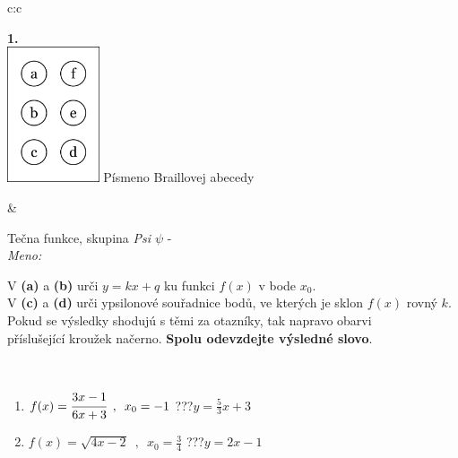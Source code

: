 \documentclass[10pt]{report}
\begin{document}
\begin{tabular}{c:c}
\begin{minipage}[c][104.5mm][t]{0.5\linewidth}
\begin{center}
\begin{minipage}{0.20\linewidth}
\begin{center}
{\Huge\bfseries 1.} \\[2mm]
\includegraphics[height=40mm]{../images/braille.png}
{\small Písmeno Braillovej abecedy}
\end{center}
\end{minipage}
\end{center}
\end{minipage}
&
\begin{minipage}[c][104.5mm][t]{0.5\linewidth}
\begin{center}
\vspace{7mm}
{\huge Tečna funkce, skupina \textit{Psi $\psi$} -}\\[5mm]
\textit{Meno:}\phantom{xxxxxxxxxxxxxxxxxxxxxxxxxxxxxxxxxxxxxxxxxxxxxxxxxxxxxxxxxxxxxxxxx}\\[5mm]
\begin{minipage}{0.95\linewidth}
\begin{center}
V \textbf{(a)} a \textbf{(b)} urči  $y = kx + q$ ku funkci $f(x)$ v bode $x_0$.\\V \textbf{(c)} a \textbf{(d)} urči ypsilonové souřadnice bodů, ve kterých je sklon $f(x)$ rovný $k$.\\Pokud se výsledky shodujú s těmi za otazníky, tak napravo obarvi\\příslušející kroužek načerno. \textbf{Spolu odevzdejte výsledné slovo}.
\end{center}
\end{minipage}
\\[1mm]
\begin{minipage}{0.79\linewidth}
\begin{center}
\begin{varwidth}{\linewidth}
\begin{enumerate}
\small
\item $f(x)=\cfrac{3x-1}{6x+3}\enspace , \enspace x_0=-1$\quad \dotfill\; ???\;\dotfill \quad $y = \frac{5}{3}x+3$
\item $f(x)=\sqrt{4x-2}\enspace , \enspace x_0=\frac{3}{4}$\quad \dotfill\; ???\;\dotfill \quad $y = 2x-1$

\end{enumerate}
\end{varwidth}
\end{center}
\end{minipage}
\end{center}
\end{minipage}
\end{tabular}
\end{document}
